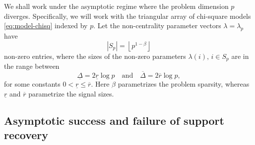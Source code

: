 
We shall work under the asymptotic regime where the problem dimension $p$ diverges.
Specifically, we will work with the triangular array of chi-square models \eqref{eq:model-chisq} indexed by $p$.
Let the non-centrality parameter vectors $\lambda = \lambda_p$ have 
\begin{equation} \label{eq:signal-sparsity}
    |S_p| = \left\lfloor p^{1-\beta} \right\rfloor
\end{equation}
non-zero entries, where the sizes of the non-zero parameters $\lambda(i),\,i\in S_p$ are in the range between
\begin{equation} \label{eq:signal-size}
    \underline{\Delta} = 2\underline{r}\log{p}
    \quad\text{and}\quad
    \overline{\Delta} = 2\overline{r}\log{p},
\end{equation}
for some constants $0<\underline{r}\le\overline{r}$.
Here $\beta$ parametrizes the problem sparsity, whereas $\underline{r}$ and $\overline{r}$ parametrize the signal sizes.

\subsection{Asymptotic success and failure of support recovery}

